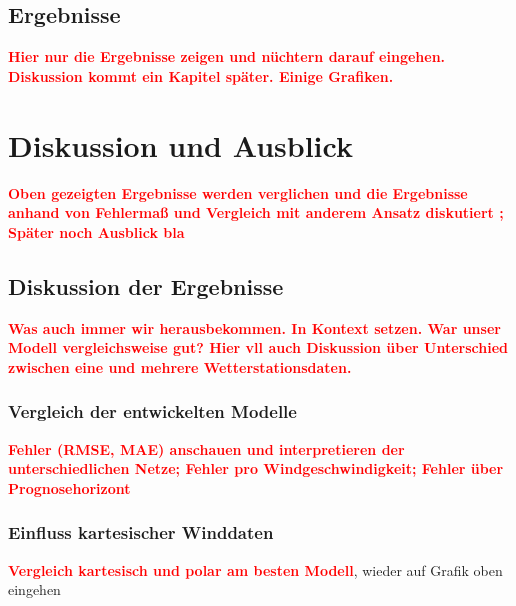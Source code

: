 \documentclass[
12pt, %
toc=listofnumbered, %
toc=chapterentrydotfill, %
numbers=noenddot, %
captions=tableheading, %
]{scrreprt}
\let\Oldsection\section
\renewcommand{\section}{\FloatBarrier\Oldsection}
\let\Oldsubsection\subsection
\renewcommand{\subsection}{\FloatBarrier\Oldsubsection}
\newcommand{\highlight}[1]{\textbf{\textcolor{red}{#1}}}
\begin{document}
\section{Ergebnisse}
\highlight{Hier nur die Ergebnisse zeigen und nüchtern darauf eingehen. Diskussion kommt ein Kapitel später. Einige Grafiken.}


\chapter{Diskussion und Ausblick}
\highlight{Oben gezeigten Ergebnisse werden verglichen und die Ergebnisse anhand von Fehlermaß und Vergleich mit anderem Ansatz diskutiert ;
Später noch Ausblick bla}

\section{Diskussion der Ergebnisse}
\highlight{Was auch immer wir herausbekommen. In Kontext setzen. War unser Modell vergleichsweise gut? Hier vll auch 
Diskussion über Unterschied zwischen eine und mehrere Wetterstationsdaten.}

\subsection{Vergleich der entwickelten Modelle}
\highlight{Fehler (RMSE, MAE) anschauen und interpretieren der unterschiedlichen Netze; 
Fehler pro Windgeschwindigkeit; Fehler über Prognosehorizont}

\subsection{Einfluss kartesischer Winddaten}
\highlight{Vergleich kartesisch und polar am besten Modell}, wieder auf Grafik oben eingehen
\end{document}
